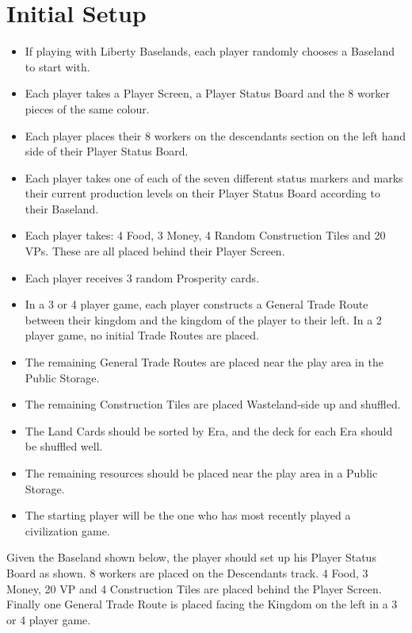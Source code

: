\documentclass[10pt,twocolumn]{article}
\begin{document}
\section{Initial Setup}
\begin{itemize}
\item If playing with Liberty Baselands, each player randomly chooses a Baseland to start with.
\item Each player takes a Player Screen, a Player Status Board and the 8 worker pieces of the same colour.
\item Each player places their 8 workers on the descendants section on the left hand side of their Player Status Board.
\item Each player takes one of each of the seven different status markers and marks their current production levels on their Player Status Board according to their Baseland.
\item Each player takes: 4 Food, 3 Money, 4 Random Construction Tiles and 20 VPs. These are all placed behind their Player Screen.
\item Each player receives 3 random Prosperity cards.
\item In a 3 or 4 player game, each player constructs a General Trade Route between their kingdom and the kingdom of the player to their left. In a 2 player game, no initial Trade Routes are placed.
\item The remaining General Trade Routes are placed near the play area in the Public Storage.
\item The remaining Construction Tiles are placed Wasteland-side up and shuffled.
\item The Land Cards should be sorted by Era, and the deck for each Era should be shuffled well.
\item The remaining resources should be placed near the play area in a Public Storage.
\item The starting player will be the one who has most recently played a civilization game.
\end{itemize}
\begin{BoxExample}Given the Baseland shown below, the player should set up his Player Status Board as shown. 8 workers are placed on the Descendants track. 4 Food, 3 Money, 20 VP and 4 Construction Tiles are placed behind the Player Screen. Finally one General Trade Route is placed facing the Kingdom on the left in a 3 or 4 player game.\end{BoxExample}
\end{document}
